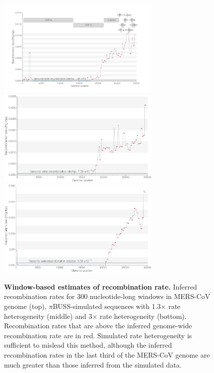 \documentclass[11pt,oneside,letterpaper]{article}
\begin{document}
\begin{figure}[h]
	\centering	
	\includegraphics[width=0.7\textwidth]{figures/supp_MERS_LDhat_windowRho.png}
	\includegraphics[width=0.7\textwidth]{figures/supp_pibuss1.3_LDhat_windowRho.png}
	\includegraphics[width=0.7\textwidth]{figures/supp_pibuss3_LDhat_windowRho.png}
	\caption{\textbf{Window-based estimates of recombination rate.}
Inferred recombination rates for 300 nucleotide-long windows in MERS-CoV genome (top), $\pi$BUSS-simulated sequences with 1.3$\times$ rate heterogeneity (middle) and 3$\times$ rate heterogeneity (bottom).
Recombination rates that are above the inferred genome-wide recombination rate are in red.
Simulated rate heterogeneity is sufficient to mislead this method, although the inferred recombination rates in the last third of the MERS-CoV genome are much greater than those inferred from the simulated data.}
	\label{rho}
\end{figure}
\end{document}
